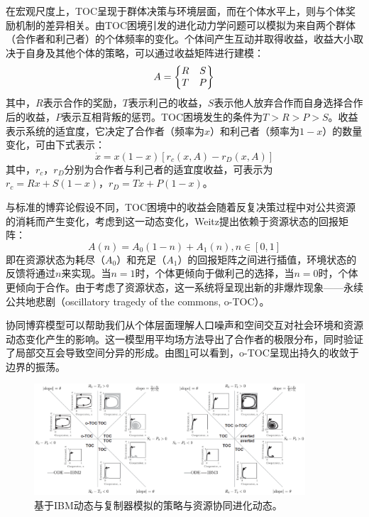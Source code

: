 在宏观尺度上，TOC呈现于群体决策与环境层面，而在个体水平上，则与个体奖励机制的差异相关。由TOC困境引发的进化动力学问题可以模拟为来自两个群体（合作者和利己者）的个体频率的变化。个体间产生互动并取得收益，收益大小取决于自身及其他个体的策略，可以通过收益矩阵进行建模：
\[A = \begin{Bmatrix}
R &S \notag\\T &P
\end{Bmatrix}\]
其中，$R$表示合作的奖励，$T$表示利己的收益，$S$表示他人放弃合作而自身选择合作后的收益，$P$表示互相背叛的惩罚。TOC困境发生的条件为$T>R>P>S$。收益表示系统的适宜度，它决定了合作者（频率为$x$）和利己者（频率为$1-x$）的数量变化，可由下式表示：
\begin{equation}
\dot{x} = x(1-x)[r_c(x,A)-r_D(x,A)]
\end{equation}
其中，$r_c$，$r_D$分别为合作者与利己者的适宜度收益，可表示为$r_c=Rx+S(1-x)$，$r_D=Tx+P(1-x)$。

与标准的博弈论假设不同，TOC困境中的收益会随着反复决策过程中对公共资源的消耗而产生变化，考虑到这一动态变化，Weitz提出依赖于资源状态的回报矩阵：
\[A(n)=A_0(1-n)+A_1(n), n\in [0,1]\]
即在资源状态为耗尽（$A_0$）和充足（$A_1$）的回报矩阵之间进行插值，环境状态的反馈将通过$n$来实现。当$n=1$时，个体更倾向于做利己的选择，当$n=0$时，个体更倾向于合作。由于考虑了资源状态，这一系统将呈现出新的非爆炸现象——永续公共地悲剧（oscillatory tragedy of the commons, o-TOC）。

协同博弈模型可以帮助我们从个体层面理解人口噪声和空间交互对社会环境和资源动态变化产生的影响。这一模型用平均场方法导出了合作者的极限分布，同时验证了局部交互会导致空间分异的形成。由图\ref{conevol}可以看到，o-TOC呈现出持久的收敛于边界的振荡。

\begin{figure}
	\label{conevol}
	\centering
	\includegraphics[width=0.9\textwidth]{pictures/Coevolutionary}
	\caption{基于IBM动态与复制器模拟的策略与资源协同进化动态。}
\end{figure}

